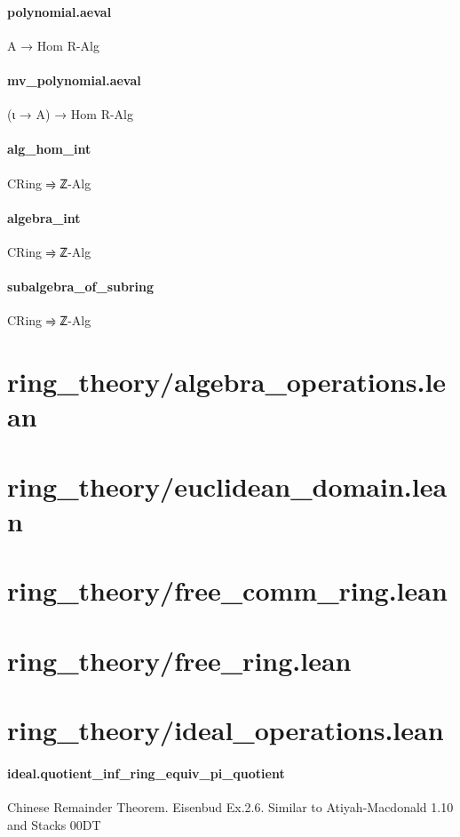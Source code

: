 \documentclass{article}
\begin{document}
\paragraph{polynomial.aeval}
\par
A → Hom
\href{R[X],A}{}R-Alg
\paragraph{mv\_polynomial.aeval}
\par
(ι → A) → Hom
\href{R[ι],A}{}R-Alg
\paragraph{alg\_hom\_int}
\par
CRing ⥤ ℤ-Alg
\paragraph{algebra\_int}
\par
CRing ⥤ ℤ-Alg
\paragraph{subalgebra\_of\_subring}
\par
CRing ⥤ ℤ-Alg
\section{ring\_theory/algebra\_operations.lean}\section{ring\_theory/euclidean\_domain.lean}\section{ring\_theory/free\_comm\_ring.lean}\section{ring\_theory/free\_ring.lean}\section{ring\_theory/ideal\_operations.lean}\paragraph{ideal.quotient\_inf\_ring\_equiv\_pi\_quotient}
\par
Chinese Remainder Theorem. Eisenbud Ex.2.6. Similar to Atiyah-Macdonald 1.10 and Stacks 00DT
\end{document}
